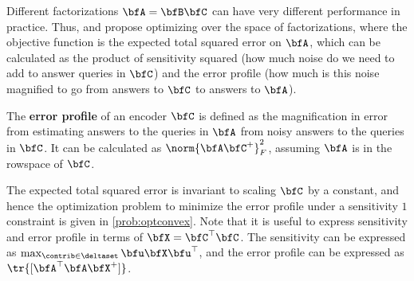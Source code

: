 

Different factorizations $\bfA = \bfB \bfC$ can have very different performance in practice.  Thus, \citet{denisov22matfact} and \citet{choquette22multiepoch} propose optimizing over the space of factorizations, where the objective function is the expected total squared error on $\bfA$, which can be calculated as the product of sensitivity squared (how much noise do we need to add to answer queries in $\bfC$) and the error profile (how much is this noise magnified to go from answers to $\bfC$ to answers to $\bfA$).

\begin{definition}
The \textbf{error profile} of an encoder $\bfC$ is defined as the magnification in error from estimating answers to the queries in $\bfA$ from noisy answers to the queries in $\bfC$.  It can be calculated as $ \norm{\bfA \bfC^{+}}_F^2$, assuming $\bfA$ is in the rowspace of $\bfC$.
\end{definition}

The expected total squared error is invariant to scaling $\bfC$  by a constant, and hence the optimization problem to minimize the error profile under a sensitivity $1$ constraint is given in \cref{prob:optconvex}.
Note that it is useful to express sensitivity and error profile in terms of $\bfX = \bfC^{\top} \bfC$.  The sensitivity can be expressed as $\max_{\contrib \in \deltaset} \bfu \bfX \bfu^{\top} $, and the error profile can be expressed as $\tr{[\bfA^{\top} \bfA \bfX^{+}]}$.  

